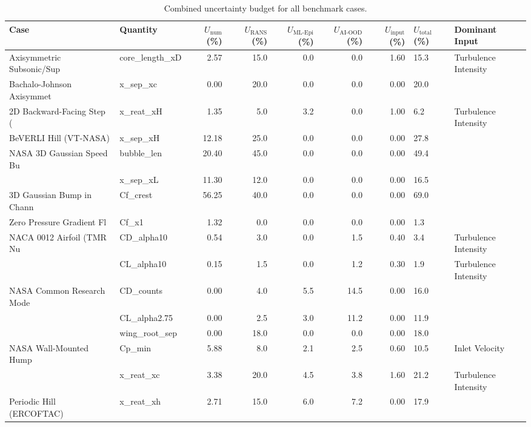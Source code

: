 \begin{table}[htbp]
\centering
\caption{Combined uncertainty budget for all benchmark cases.}
\label{tab:uq_budget}
\small
\begin{tabular}{llrrrrrl}
\toprule
Case & Quantity & $U_\text{num}$ (\%) & $U_\text{RANS}$ (\%) & $U_\text{ML-Epi}$ (\%) & $U_\text{AI-OOD}$ (\%) & $U_\text{input}$ (\%) & $U_\text{total}$ (\%) & Dominant Input \\
\midrule
  Axisymmetric Subsonic/Sup & core_length_xD & 2.57 & 15.0 & 0.0 & 0.0 & 1.60 & 15.3 & Turbulence Intensity \\
  Bachalo-Johnson Axisymmet & x_sep_xc & 0.00 & 20.0 & 0.0 & 0.0 & 0.00 & 20.0 &  \\
  2D Backward-Facing Step ( & x_reat_xH & 1.35 & 5.0 & 3.2 & 0.0 & 1.00 & 6.2 & Turbulence Intensity \\
  BeVERLI Hill (VT-NASA) & x_sep_xH & 12.18 & 25.0 & 0.0 & 0.0 & 0.00 & 27.8 &  \\
  NASA 3D Gaussian Speed Bu & bubble_len & 20.40 & 45.0 & 0.0 & 0.0 & 0.00 & 49.4 &  \\
   & x_sep_xL & 11.30 & 12.0 & 0.0 & 0.0 & 0.00 & 16.5 &  \\
  3D Gaussian Bump in Chann & Cf_crest & 56.25 & 40.0 & 0.0 & 0.0 & 0.00 & 69.0 &  \\
  Zero Pressure Gradient Fl & Cf_x1 & 1.32 & 0.0 & 0.0 & 0.0 & 0.00 & 1.3 &  \\
  NACA 0012 Airfoil (TMR Nu & CD_alpha10 & 0.54 & 3.0 & 0.0 & 1.5 & 0.40 & 3.4 & Turbulence Intensity \\
   & CL_alpha10 & 0.15 & 1.5 & 0.0 & 1.2 & 0.30 & 1.9 & Turbulence Intensity \\
  NASA Common Research Mode & CD_counts & 0.00 & 4.0 & 5.5 & 14.5 & 0.00 & 16.0 &  \\
   & CL_alpha2.75 & 0.00 & 2.5 & 3.0 & 11.2 & 0.00 & 11.9 &  \\
   & wing_root_sep & 0.00 & 18.0 & 0.0 & 0.0 & 0.00 & 18.0 &  \\
  NASA Wall-Mounted Hump & Cp_min & 5.88 & 8.0 & 2.1 & 2.5 & 0.60 & 10.5 & Inlet Velocity \\
   & x_reat_xc & 3.38 & 20.0 & 4.5 & 3.8 & 1.60 & 21.2 & Turbulence Intensity \\
  Periodic Hill (ERCOFTAC) & x_reat_xh & 2.71 & 15.0 & 6.0 & 7.2 & 0.00 & 17.9 &  \\
\bottomrule
\end{tabular}
\end{table}